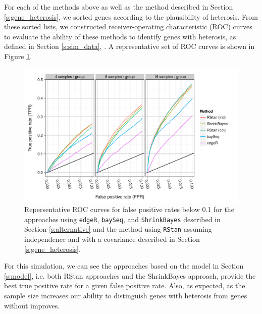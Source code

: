 \documentclass[useAMS,usenatbib,referee]{biom}
\begin{document}
For each of the methods above as well as the method described in Section \ref{s:gene_heterosis}, we sorted genes according to the plausibility of heterosis. From these sorted lists, we constructed receiver-operating characteristic (ROC) curves to evaluate the ability of these methods to identify genes with heterosis, as defined in Section \ref{s:sim_data}, \citep{landau2013dispersion}. A representative set of ROC curves is shown in Figure \ref{f:roc}. 
\begin{figure}[htbp]
\centerline{\includegraphics[width=\textwidth]{exampleROC0_1}}
\caption{Repersentative ROC curves for false positive rates below 0.1 for the approaches using {\tt edgeR}, {\tt baySeq},  and {\tt ShrinkBayes} described in Section \ref{s:alternative} and the method using {\tt RStan} assuming independence and with a covariance described in Section \ref{s:gene_heterosis}.}
\label{f:roc}
\end{figure}
For this simulation, we can see the approaches based on the model in Section \ref{s:model}, i.e. both RStan approaches and the ShrinkBayes approach, provide the best true positive rate for a given false positive rate. Also, as expected, as the sample size increases our ability to distinguish genes with heterosis from genes without improves.
\end{document}
